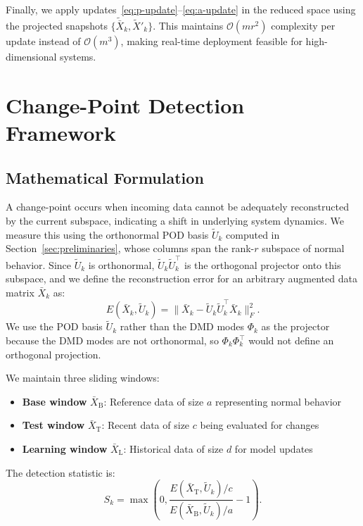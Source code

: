 \documentclass[conference]{IEEEtran}
\newcommand{\ui}[2]{#1_{\mathrm{#2}}}
\begin{document}
Finally, we apply updates~\eqref{eq:p-update}--\eqref{eq:a-update} in the reduced space using the projected snapshots \(\{\tilde{\bar{X}}_k, \tilde{X}'_k\}\). This maintains \(\mathcal{O}(mr^2)\) complexity per update instead of \(\mathcal{O}(m^3)\), making real-time deployment feasible for high-dimensional systems.

\section{Change-Point Detection Framework}\label{sec:method}

\subsection{Mathematical Formulation}

A change-point occurs when incoming data cannot be adequately reconstructed by the current subspace, indicating a shift in underlying system dynamics. We measure this using the orthonormal POD basis \(\tilde{U}_k\) computed in Section~\ref{sec:preliminaries}, whose columns span the rank-\(r\) subspace of normal behavior. Since \(\tilde{U}_k\) is orthonormal, \(\tilde{U}_k \tilde{U}_k^\top\) is the orthogonal projector onto this subspace, and we define the reconstruction error for an arbitrary augmented data matrix \(\bar{X}_k\) as:
\begin{equation}\label{eq:reconstruction-error}
    E(\bar{X}_k, \tilde{U}_k) = \|\bar{X}_k - \tilde{U}_k \tilde{U}_k^\top \bar{X}_k\|_F^2.
\end{equation}
We use the POD basis \(\tilde{U}_k\) rather than the DMD modes \(\Phi_k\) as the projector because the DMD modes are not orthonormal, so \(\Phi_k \Phi_k^\top\) would not define an orthogonal projection.

We maintain three sliding windows:
\begin{itemize}
    \item \textbf{Base window} \(\ui{\bar{X}}{B}\): Reference data of size \(a\) representing normal behavior
    \item \textbf{Test window} \(\ui{\bar{X}}{T}\): Recent data of size \(c\) being evaluated for changes
    \item \textbf{Learning window} \(\ui{\bar{X}}{L}\): Historical data of size \(d\) for model updates
\end{itemize}

The detection statistic is:
\begin{equation}\label{eq:cpd-statistic}
    S_k = \max\left(0, \frac{E(\ui{\bar{X}}{T}, \tilde{U}_k)/c}{E(\ui{\bar{X}}{B}, \tilde{U}_k)/a} - 1\right).
\end{equation}
\end{document}
